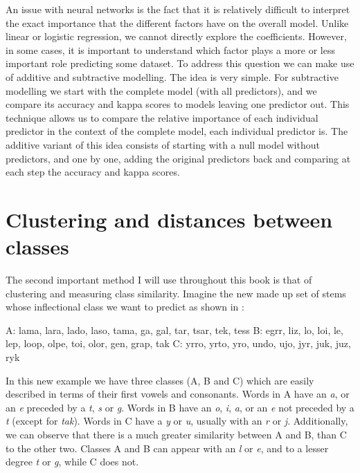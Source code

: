 
An issue with neural networks is the fact that it is relatively difficult to interpret the exact importance that the different factors have on the overall model. Unlike linear or logistic regression, we cannot directly explore the coefficients. However, in some cases, it is important to understand which factor plays a more or less important role predicting some dataset. To address this question we can make use of additive and subtractive modelling. The idea is very simple. For subtractive modelling we start with the complete model (with all predictors), and we compare its accuracy and kappa scores to models leaving one predictor out. This technique allows us to compare the relative importance of each individual predictor in the context of the complete model, each individual predictor is. The additive variant of this idea consists of starting with a null model without predictors, and one by one, adding the original predictors back and comparing at each step the accuracy and kappa scores.

\section{Clustering and distances between classes}


The second important method I will use throughout this book is that of clustering and measuring class similarity. Imagine the new made up set of stems whose inflectional class we want to predict as shown in :

\begin{exe}
    \ex \label{inf-class-2}
    \begin{xlist}
        \ex A: lama, lara, lado, laso, tama, ga, gal, tar, tsar, tek, tess
        \ex B: egrr, liz, lo, loi, le, lep, loop, olpe, toi, olor, gen, grap, tak
        \ex C: yrro, yrto, yro, undo, ujo, jyr, juk, juz, ryk
    \end{xlist}
\end{exe}

In this new example we have three classes (A, B and C) which are easily described in terms of their first vowels and consonants. Words in A have an \textit{a}, or an \textit{e} preceded by a \textit{t}, \textit{s} or \textit{g}. Words in B have an \textit{o}, \textit{i}, \textit{a}, or an \textit{e} not preceded by a \textit{t} (except for \textit{tak}). Words in C have a \textit{y} or \textit{u}, usually with an \textit{r} or \textit{j}. Additionally, we can observe that there is a much greater similarity between A and B, than C to the other two. Classes A and B can appear with an \textit{l} or \textit{e}, and to a lesser degree \textit{t} or \textit{g}, while C does not.


